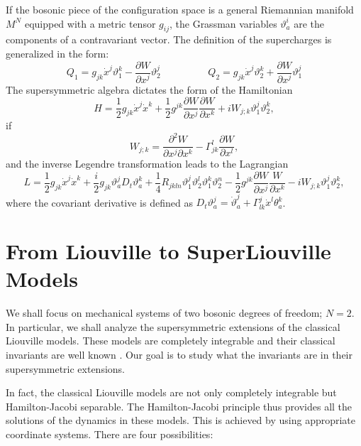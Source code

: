 \documentclass[a4paper,11pt,twoside]{article}
\begin{document}
If the bosonic piece of the configuration space is a general
Riemannian manifold $M^N$ equipped with a metric tensor $g_{ij}$, the Grassman variables $\vartheta_a^i$ are the components of a
contravariant vector. The definition of the supercharges is generalized in the form:
\[
Q_1=g_{jk} \dot{x}^j \vartheta_1^k-\displaystyle\frac{\partial W}{\partial x^j} \vartheta_2^j \hspace{2cm}
Q_2=g_{jk} \dot{x}^j \vartheta_2^k+\displaystyle\frac{\partial W}{\partial x^j}\vartheta_1^j
\]
The supersymmetric algebra dictates the form of the Hamiltonian
\[
H=\frac{1}{2} g_{jk} \dot{x}^j \dot{x}^k + \frac{1}{2} g^{jk}
\frac{\partial W}{\partial x^j}\frac{\partial W}{\partial x^k} + i
W_{j;k} \vartheta^j_1 \vartheta^k_2,
\]
if
\[
W_{j;k}=\frac{\partial^2 W}{\partial x^j\partial
x^k}-\Gamma_{jk}^l\frac{\partial W}{\partial x^l},
\]
and the inverse Legendre transformation leads to the Lagrangian
\begin{equation}
L=\displaystyle\frac{1}{2} g_{jk} \dot{x}^j \dot{x}^k
+\displaystyle\frac{i}{2} g_{jk} \vartheta_a^j D_t
\vartheta_a^k+\displaystyle\frac{1}{4} R_{jkln} \vartheta_1^j
\vartheta_2^l \vartheta_1^k \vartheta_2^n
-\displaystyle\frac{1}{2} g^{jk}\frac{\partial W}{\partial x^j}
\frac{W}{\partial x^k} -i W_{j;k} \vartheta_1^j \vartheta_2^k ,
\label{eq:gene}
\end{equation}
where the covariant derivative is defined as $D_t \vartheta^j_a =\dot{\vartheta}^j_a + \Gamma^j_{lk} \dot{x}^l \theta^k_a$.

\section{From Liouville to SuperLiouville Models}

We shall focus on mechanical systems of two bosonic degrees of
freedom; $N=2$. In particular, we shall analyze the supersymmetric
extensions of the classical Liouville models. These models are
completely integrable and their classical invariants are well
known \cite{Li}. Our goal is to study what the invariants are in
their supersymmetric extensions.

In fact, the classical Liouville models are not only completely
integrable but Hamilton-Jacobi separable. The Hamilton-Jacobi
principle thus provides all the solutions of the dynamics in these
models. This is achieved by using appropriate coordinate systems.
There are four possibilities:

\vspace*{0.1cm}
\end{document}
